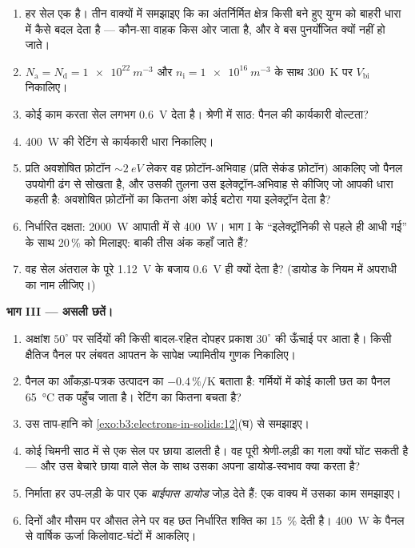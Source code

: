 \begin{problem}
\begin{enumerate}[resume]
  \item हर सेल एक  है। तीन वाक्यों में समझाइए
        कि  का अंतर्निर्मित क्षेत्र किसी बने हुए
        युग्म को बाहरी धारा में कैसे बदल देता है --- कौन-सा वाहक
        किस ओर जाता है, और वे बस पुनर्योजित क्यों नहीं हो जाते।
  \item $N_{\text{a}} = N_{\text{d}} = \qty{1e22}{m^{-3}}$
        और $n_{\text{i}} = \qty{1e16}{m^{-3}}$ के साथ
        \qty{300}{K} पर $V_{\text{bi}}$ निकालिए।
  \item कोई काम करता सेल लगभग \qty{0.6}{V} देता है। श्रेणी में साठ:
        पैनल की कार्यकारी वोल्टता?
  \item \qty{400}{W} की रेटिंग से कार्यकारी धारा निकालिए।
  \item प्रति अवशोषित फ़ोटॉन $\sim\qty{2}{eV}$ लेकर वह फ़ोटॉन-अभिवाह
        (प्रति सेकंड फ़ोटॉन) आकलिए जो पैनल उपयोगी ढंग से सोखता है,
        और उसकी तुलना उस इलेक्ट्रॉन-अभिवाह से कीजिए जो आपकी धारा
        कहती है: अवशोषित फ़ोटॉनों का कितना अंश कोई बटोरा गया
        इलेक्ट्रॉन देता है?
  \item निर्धारित दक्षता: \qty{2000}{W} आपाती में से
        \qty{400}{W}। भाग I के ``इलेक्ट्रॉनिकी से पहले ही आधी
        गई'' के साथ 20\,\% को मिलाइए: बाकी तीस अंक कहाँ जाते हैं?
  \item वह सेल अंतराल के पूरे \qty{1.12}{V} के बजाय
        \qty{0.6}{V} ही क्यों देता है? (डायोड के नियम में अपराधी का
        नाम लीजिए।)
\end{enumerate}

\medskip\noindent\textbf{भाग III --- असली छतें।}

\begin{enumerate}[resume]
  \item अक्षांश $50^\circ$ पर सर्दियों की किसी बादल-रहित दोपहर
        प्रकाश $30^\circ$ की ऊँचाई पर आता है। किसी क्षैतिज पैनल पर
        लंबवत आपतन के सापेक्ष ज्यामितीय गुणक
        निकालिए।
  \item पैनल का आँकड़ा-पत्रक उत्पादन का $-0.4\,\%/\text{K}$ बताता
        है: गर्मियों में कोई काली छत का पैनल \qty{65}{\celsius} तक
        पहुँच जाता है। रेटिंग का कितना बचता है?
  \item उस ताप-हानि को \cref{exo:b3:electrons-in-solids:12}(घ) से
        समझाइए।
  \item कोई चिमनी साठ में से एक सेल पर छाया डालती है। वह पूरी
        श्रेणी-लड़ी का गला क्यों घोंट सकती है --- और उस बेचारे छाया
        वाले सेल के साथ उसका अपना डायोड-स्वभाव क्या करता है?
  \item निर्माता हर उप-लड़ी के पार एक \emph{बाईपास डायोड} जोड़
        देते हैं: एक वाक्य में उसका काम समझाइए।
  \item दिनों और मौसम पर औसत लेने पर वह छत निर्धारित शक्ति का
        \qty{15}{\percent} देती है। \qty{400}{W} के पैनल से वार्षिक
        ऊर्जा किलोवाट-घंटों में आकलिए।
\end{enumerate}


\end{problem}
